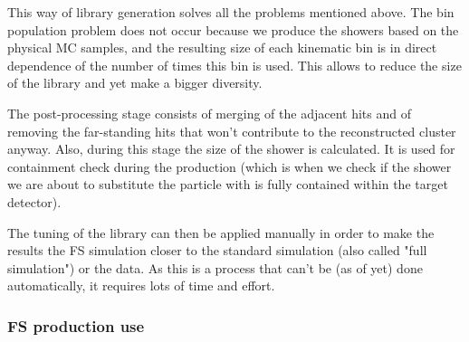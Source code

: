 \begin{figure}
\end{figure}

This way of library generation solves all the problems mentioned above. The bin population problem does not occur because we produce the showers based on the physical MC samples, and the resulting size of each kinematic bin is in direct dependence of the number of times this bin is used. This allows to reduce the size of the library and yet make a bigger diversity.

The post-processing stage consists of merging of the adjacent hits and of removing the far-standing hits that won't contribute to the reconstructed cluster anyway. Also, during this stage the size of the shower is calculated. It is used for containment check during the production (which is when we check if the shower we are about to substitute the particle with is fully contained within the target detector).

The tuning of the library can then be applied manually in order to make the results the FS simulation closer to the standard simulation (also called "full simulation") or the data. As this is a process that can't be (as of yet) done automatically, it requires lots of time and effort.

\subsubsection{FS production use}
\label{sec:MC_FS_prod}

